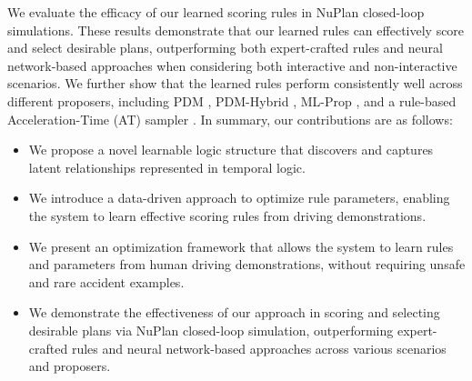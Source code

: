 We evaluate the efficacy of our learned scoring rules in NuPlan \cite{Karnchanachari2024TowardsLP} closed-loop simulations. These results demonstrate that our learned rules can effectively score and select desirable plans, outperforming both expert-crafted rules and neural network-based approaches when considering both interactive and non-interactive scenarios. We further show that the learned rules perform consistently well across different proposers, including PDM \cite{Dauner2023CORL}, PDM-Hybrid \cite{Dauner2023CORL}, ML-Prop \cite{Karnchanachari2024TowardsLP}, and a rule-based Acceleration-Time (AT) sampler \cite{jiang2022efficient}. In summary, our contributions are as follows:
\begin{itemize}
    \item We propose a novel learnable logic structure that discovers and captures latent relationships represented in temporal logic.
    \item We introduce a data-driven approach to optimize rule parameters, enabling the system to learn effective scoring rules from driving demonstrations.
    \item We present an optimization framework that allows the system to learn rules and parameters from human driving demonstrations, without requiring unsafe and rare accident examples.
    \item We demonstrate the effectiveness of our approach in scoring and selecting desirable plans via NuPlan closed-loop simulation, outperforming expert-crafted rules \cite{Dauner2023CORL} and neural network-based approaches \cite{jiang2022efficient} across various scenarios and proposers.
\end{itemize}